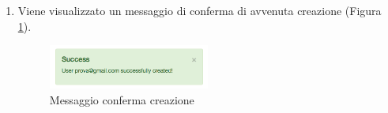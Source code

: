 \begin{enumerate}
			\item Viene visualizzato un messaggio di conferma di avvenuta creazione  (Figura \ref{fig:confermaCreazioneUtente}).

				\begin{figure}[H]
					\centering \includegraphics[width=0.5\textwidth]{img/confermaCreazioneUtente.png}
					\caption{ \label{fig:confermaCreazioneUtente} Messaggio conferma creazione }
				\end{figure}

		\end{enumerate}  

	\clearpage
